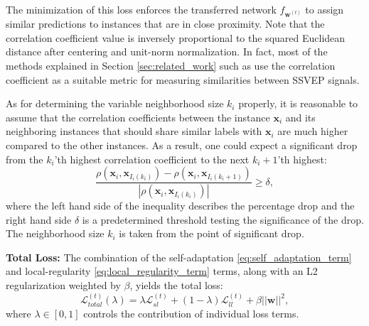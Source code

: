 \documentclass[12pt]{iopart}
\newcommand{\matr}[1]{\mathbf{#1}}
\begin{document}
%

The minimization of this loss enforces the transferred network $f_{\matr{w}^{(t)}}$ to assign similar predictions to instances that are in close proximity. Note that the correlation coefficient value is inversely proportional to the squared Euclidean distance after centering and unit-norm normalization. In fact, most of the methods explained in Section \ref{sec:related_work} such as \cite{our_ensemble,oacca,fbcca} use the correlation coefficient as a suitable metric for measuring similarities between SSVEP signals. 


As for determining the variable neighborhood size $k_i$ properly, it is reasonable to assume that the correlation coefficients between the instance $\matr{x}_i$ and its neighboring instances that should share similar labels with $\matr{x}_i$ are much higher compared to the other instances. As a result, one could expect a significant drop from the $k_i$'{th} highest correlation coefficient to the next $k_i+1$'{th} highest:
\begingroup
\begin{equation}
    \frac{\rho(\matr{x}_i,\matr{x}_{I_i(k_i)})-\rho(\matr{x}_i,\matr{x}_{I_i(k_i+1)})}{|\rho(\matr{x}_i,\matr{x}_{I_i(k_i)})|} \geq  \delta, \label{eq:threshold_neighbour}
\end{equation}
\endgroup
where the left hand side of the inequality describes the percentage drop and the right hand side $\delta$ is a predetermined threshold testing the significance of the drop. The neighborhood size $k_i$ is taken from the point of significant drop.






{\bf Total Loss: } The combination of the self-adaptation \eqref{eq:self_adaptation_term} and local-regularity \eqref{eq:local_regularity_term} terms, along with an L2 regularization {weighted by $\beta$}, yields the total loss:
\begin{equation}
    \mathcal{L}_{{total}}^{(t)}(\lambda)=\lambda\mathcal{L}_{sl}^{(t)}+(1-\lambda)\mathcal{L}_{{ll}}^{(t)} + \beta ||\mathbf w||^{2},
    \label{eq:total_loss}
\end{equation}
where $\lambda\in[0,1]$ controls the contribution of individual loss terms.
\end{document}
